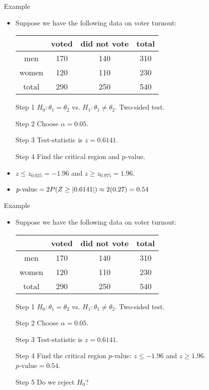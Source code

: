 \documentclass[10pt, xcolor=table]{beamer}
\DeclarePairedDelimiter\abs{\lvert}{\rvert}%
\begin{document}
\begin{frame}{Example}
\begin{itemize}
\setlength{\itemsep}{8pt}
\item Suppose we have the following data on voter turnout:
\medskip
{\footnotesize
\begin{table}[]
\begin{tabular}{|c|cc|c|}
\hline
      & voted & did not vote & total \\ \hline
men   & 170 & 140       & 310  \\ 
women & 120 & 110        & 230  \\ \hline
total & 290  & 250        & 540     \\ \hline
\end{tabular}
\end{table}
}
\item[Step 1] $H_0: \theta_1 = \theta_2$ vs. $H_1: \theta_1 \neq \theta_2$. Two-sided test. 
\item[Step 2] Choose $\alpha = 0.05$. 
\item[Step 3] Test-statistic is $z = 0.6141$.
\item[Step 4] Find the critical region and p-value.
\item<2->[] $ z \leq z_{0.025} = -1.96$ and $z \geq z_{0.975} = 1.96$.
\item<3->[] $p\text{-value} = 2P(Z \geq \abs{0.6141}) \approx 2(0.27) = 0.54$
\end{itemize}
\end{frame}

\begin{frame}{Example}
\begin{itemize}
\setlength{\itemsep}{12pt}
\item Suppose we have the following data on voter turnout:
\medskip
{\footnotesize
\begin{table}[]
\begin{tabular}{|c|cc|c|}
\hline
      & voted & did not vote & total \\ \hline
men   & 170 & 140       & 310  \\ 
women & 120 & 110        & 230  \\ \hline
total & 290  & 250        & 540     \\ \hline
\end{tabular}
\end{table}
}
\item[Step 1] $H_0: \theta_1 = \theta_2$ vs. $H_1: \theta_1 \neq \theta_2$. Two-sided test.      
\item[Step 2] Choose $\alpha = 0.05$. 
\item[Step 3] Test-statistic is $z = 0.6141$.
\item[Step 4] Find the critical region $p$-value: $z \leq -1.96$ and $z \geq 1.96$. $p\text{-value} = 0.54$.
\item[Step 5] Do we reject $H_0$? 
\end{itemize}
\end{frame}
\end{document}
